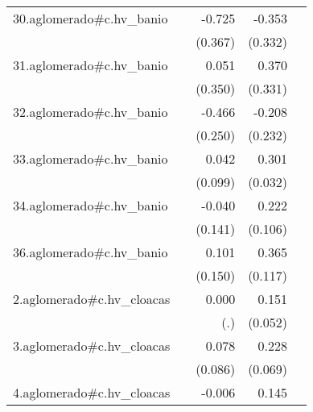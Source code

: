 {\begin{longtable}{l*{4}{D{.}{.}{-1}}}
\addlinespace
30.aglomerado#c.hv\_banio&                     &      -0.725\sym{*}  &      -0.353         &                     \\
            &                     &     (0.367)         &     (0.332)         &                     \\
\addlinespace
31.aglomerado#c.hv\_banio&                     &       0.051         &       0.370         &                     \\
            &                     &     (0.350)         &     (0.331)         &                     \\
\addlinespace
32.aglomerado#c.hv\_banio&                     &      -0.466         &      -0.208         &                     \\
            &                     &     (0.250)         &     (0.232)         &                     \\
\addlinespace
33.aglomerado#c.hv\_banio&                     &       0.042         &       0.301\sym{***}&                     \\
            &                     &     (0.099)         &     (0.032)         &                     \\
\addlinespace
34.aglomerado#c.hv\_banio&                     &      -0.040         &       0.222\sym{*}  &                     \\
            &                     &     (0.141)         &     (0.106)         &                     \\
\addlinespace
36.aglomerado#c.hv\_banio&                     &       0.101         &       0.365\sym{**} &                     \\
            &                     &     (0.150)         &     (0.117)         &                     \\
\addlinespace
2.aglomerado#c.hv\_cloacas&                     &       0.000         &       0.151\sym{**} &                     \\
            &                     &         (.)         &     (0.052)         &                     \\
\addlinespace
3.aglomerado#c.hv\_cloacas&                     &       0.078         &       0.228\sym{***}&                     \\
            &                     &     (0.086)         &     (0.069)         &                     \\
\addlinespace
4.aglomerado#c.hv\_cloacas&                     &      -0.006         &       0.145\sym{***}&                     \\

\end{longtable}}
